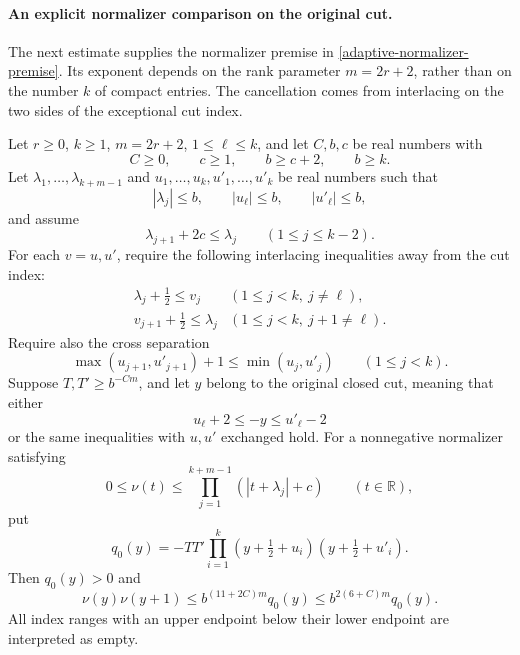 \paragraph{An explicit normalizer comparison on the original cut.}
The next estimate supplies the normalizer premise in
\eqref{adaptive-normalizer-premise}. Its exponent depends on the
rank parameter \(m=2r+2\), rather than on the number \(k\) of
compact entries. The cancellation comes from interlacing on the
two sides of the exceptional cut index.

\begin{lemma}
\label{lem:archimedean-normalizer-comparison}
Let \(r\ge0\), \(k\ge1\), \(m=2r+2\), \(1\le\ell\le k\),
and let \(C,b,c\) be real numbers with
\[
 C\ge0,\qquad c\ge1,\qquad b\ge c+2,\qquad b\ge k.
\]
Let \(\lambda_1,\ldots,\lambda_{k+m-1}\) and
\(u_1,\ldots,u_k,u'_1,\ldots,u'_k\) be real numbers such that
\[
 |\lambda_j|\le b,\qquad |u_\ell|\le b,\qquad |u'_\ell|\le b,
                                                        \tag{NC1}
\]
and assume
\[
 \lambda_{j+1}+2c\le\lambda_j\qquad(1\le j\le k-2).
                                                        \tag{NC2}
\]
For each \(v=u,u'\), require the following interlacing
inequalities away from the cut index:
\[
 \begin{array}{ll}
 \lambda_j+\tfrac12\le v_j
       & (1\le j<k,\ j\ne\ell),\\
 v_{j+1}+\tfrac12\le\lambda_j
       & (1\le j<k,\ j+1\ne\ell).
 \end{array}                                            \tag{NC3}
\]
Require also the cross separation
\[
 \max(u_{j+1},u'_{j+1})+1
             \le\min(u_j,u'_j)\qquad(1\le j<k).
                                                        \tag{NC4}
\]
Suppose \(T,T'\ge b^{-Cm}\), and let \(y\) belong to the
original closed cut, meaning that either
\[
       u_\ell+2\le-y\le u'_\ell-2
\]
or the same inequalities with \(u,u'\) exchanged hold.
For a nonnegative normalizer satisfying
\[
 0\le\nu(t)\le
       \prod_{j=1}^{k+m-1}(|t+\lambda_j|+c)
       \qquad(t\in\mathbb R),
                                                        \tag{NC5}
\]
put
\[
 q_0(y)=-TT'\prod_{i=1}^k
             (y+\tfrac12+u_i)(y+\tfrac12+u'_i).
\]
Then \(q_0(y)>0\) and
\[
 \nu(y)\nu(y+1)
       \le b^{(11+2C)m}q_0(y)
       \le b^{2(6+C)m}q_0(y).                           \tag{NC6}
\]
All index ranges with an upper endpoint below their lower
endpoint are interpreted as empty.
\end{lemma}

